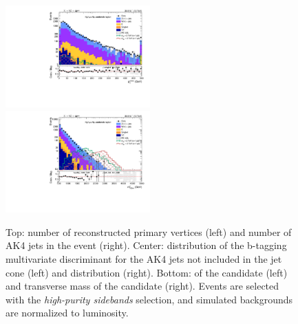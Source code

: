\begin{figure}[!htb]
\begin{center}
    \includegraphics[width=0.495\textwidth]{plots/v9_thesis/XVZnnhpSB/X_pt.pdf}
    \includegraphics[width=0.495\textwidth]{plots/v9_thesis/XVZnnhpSB/X_tmass.pdf}

    \caption{Top: number of reconstructed primary vertices (left) and number of AK4 jets in the event (right). Center: distribution of the b-tagging multivariate discriminant for the AK4 jets not included in the \V jet cone (left) and \MET distribution (right). Bottom: \pt of the \VZ candidate (left) and transverse mass of the \VZ candidate (right). Events are selected with the \emph{high-purity sidebands} selection, and simulated backgrounds are normalized to luminosity.}
  \end{center}
\end{figure}

\clearpage


